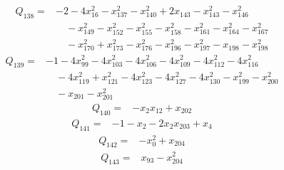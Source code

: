 \begin{equation*}\begin{split}
Q_{138}={}&-2 - 4x_{16}^{2} - x_{137}^{2} - x_{140}^{2} + 2x_{143} - x_{143}^{2} - x_{146}^{2}\\
&\quad -x_{149}^{2} - x_{152}^{2} - x_{155}^{2} - x_{158}^{2} - x_{161}^{2} - x_{164}^{2} - x_{167}^{2}\\
&\quad -x_{170}^{2} + x_{173}^{2} - x_{176}^{2} - x_{196}^{2} - x_{197}^{2} - x_{198} - x_{198}^{2}
\end{split}\end{equation*}
\begin{equation*}\begin{split}
Q_{139}={}&-1 - 4x_{99}^{2} - 4x_{103}^{2} - 4x_{106}^{2} - 4x_{109}^{2} - 4x_{112}^{2} - 4x_{116}^{2}\\
&\quad -4x_{119}^{2} + x_{121}^{2} - 4x_{123}^{2} - 4x_{127}^{2} - 4x_{130}^{2} - x_{199}^{2} - x_{200}^{2}\\
&\quad -x_{201} - x_{201}^{2}
\end{split}\end{equation*}
\begin{equation*}\begin{split}
Q_{140}={}&-x_{2} x_{12} + x_{202}
\end{split}\end{equation*}
\begin{equation*}\begin{split}
Q_{141}={}&-1 - x_{2} - 2x_{2} x_{203} + x_{4}
\end{split}\end{equation*}
\begin{equation*}\begin{split}
Q_{142}={}&-x_{0}^{2} + x_{204}
\end{split}\end{equation*}
\begin{equation*}\begin{split}
Q_{143}={}&x_{93} - x_{204}^{2}
\end{split}\end{equation*}
\endgroup

